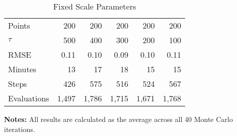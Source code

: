 \begin{table}\onehalfspacing
\begin{center}
\begin{threeparttable}
  \captionsetup{width=30cm}
  \caption{Fixed Scale Parameters}
  \label{Fixed Scale Parameters}
  \begin{tabular}{lrrrrr}\toprule
  Points      & 200 & 200 & 200  & 200 & 200\\
  $\tau$ & 500 &  400 &   300 & 200  & 100\\
  \midrule
  RMSE        & 0.11 &   0.10 &    0.09 &  0.10  &  0.11\\
  Minutes     &  13 &      17 &    18 &   15 &  15\\
  Steps       &  426 &   575 &    516 &  524 &  567\\
  Evaluations & 1,497 &   1,786 &    1,715 &  1,671 &  1,768\\
  \bottomrule
  \end{tabular}\scriptsize
  \begin{tablenotes}\item \textbf{Notes:} All results are calculated as the average across all 40 Monte Carlo iterations.
\end{tablenotes}
  \end{threeparttable}
  \end{center}
\end{table}
